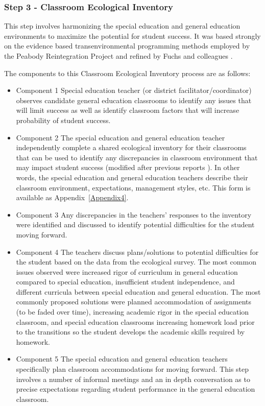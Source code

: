 \documentclass[twoside]{article}
\begin{document}
\subsubsection{Step 3 - Classroom Ecological Inventory}
This step involves harmonizing the special education and general education environments to maximize the potential for student success. It was based strongly on the evidence based transenvironmental programming methods employed by the Peabody Reintegration Project and refined by Fuchs and colleagues \parencite{fuchs1993conservative,fuchs1994classroom,marden2013criteria,mathes1998preparing,wadsworth1999preparing,wadsworth1999preparing}. 

The components to this Classroom Ecological Inventory process are as follows: 
\begin{itemize}
\item Component 1 Special education teacher (or district facilitator/coordinator) observes candidate general education classrooms to identify any issues that will limit success as well as identify classroom factors that will increase probability of student success. 

\item Component 2 The special education and general education teacher independently complete a shared ecological inventory for their classrooms that can be used to identify any discrepancies in classroom environment that may impact student success (modified after previous reports \parencite{fuchs1994classroom,marden2013criteria}). In other words, the special education and general education teachers describe their classroom environment, expectations, management styles, etc. This form is available as Appendix~\ref{Appendix4}.

\item Component 3 Any discrepancies in the teachers' responses to the inventory were identified and discussed to identify potential difficulties for the student moving forward.

\item Component 4 The teachers discuss plans/solutions to potential difficulties for the student based on the data from the ecological survey. The most common issues observed were increased rigor of curriculum in general education compared to special education, insufficient student independence, and different curricula between special education and general education. The most commonly proposed solutions were planned accommodation of assignments (to be faded over time), increasing academic rigor in the special education classroom, and special education classrooms increasing homework load prior to the transitions so the student develops the academic skills required by homework. 

\item Component 5 The special education and general education teachers specifically plan classroom accommodations for moving forward. This step involves a number of informal meetings and an in depth conversation as to precise expectations regarding student performance in the general education classroom. 
\end{itemize}
\end{document}
